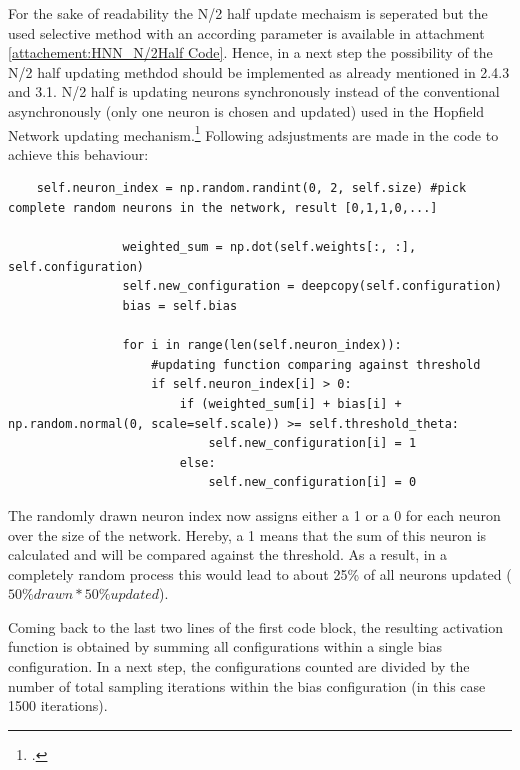 For the sake of readability the N/2 half update mechaism is seperated but the used selective method with an according parameter is available in attachment \ref{attachement:HNN_N/2Half Code}.
Hence, in a next step the possibility of the N/2 half updating methdod should be implemented as already mentioned in 2.4.3 and 3.1.
N/2 half is updating neurons synchronously instead of the conventional asynchronously (only one neuron is chosen and updated) used in the Hopfield Network updating mechanism.\footcite[cf.][23-24]{caiHarnessingIntrinsicNoise2019}
Following adsjustments are made in the code to achieve this behaviour:
\begin{lstlisting}
    self.neuron_index = np.random.randint(0, 2, self.size) #pick complete random neurons in the network, result [0,1,1,0,...]

                weighted_sum = np.dot(self.weights[:, :], self.configuration)   
                self.new_configuration = deepcopy(self.configuration)
                bias = self.bias 

                for i in range(len(self.neuron_index)):              
                    #updating function comparing against threshold
                    if self.neuron_index[i] > 0:
                        if (weighted_sum[i] + bias[i] + np.random.normal(0, scale=self.scale)) >= self.threshold_theta:          
                            self.new_configuration[i] = 1
                        else:
                            self.new_configuration[i] = 0
\end{lstlisting}
The randomly drawn neuron index now assigns either a 1 or a 0 for each neuron over the size of the network.
Hereby, a 1 means that the sum of this neuron is calculated and will be compared against the threshold. 
As a result, in a completely random process this would lead to about 25\% of all neurons updated (\(50\% drawn * 50\% updated\)).

Coming back to the last two lines of the first code block, the resulting activation function is obtained by summing all configurations within a single bias configuration.
In a next step, the configurations counted are divided by the number of total sampling iterations within the bias configuration (in this case 1500 iterations).

